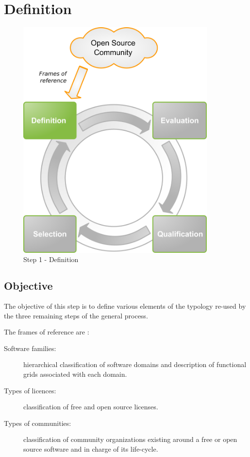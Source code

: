 %
\section{Definition}
\begin{figure}
\center
\includegraphics[width=10cm]{images/definir}
\caption{Step 1 - Definition}
\end{figure}


\subsection{Objective}
The objective of this step is to define various elements of the typology re-used by the three 
remaining steps of the general process.


The frames of reference are :
\begin{description}
\item [Software families:] hierarchical classification of software domains and description of functional grids associated with each domain.
\item [Types of licences:] classification of free and open source licenses.
\item [Types of communities:] classification of community organizations existing around a free or open source software and in charge of its life-cycle.
\end{description}


